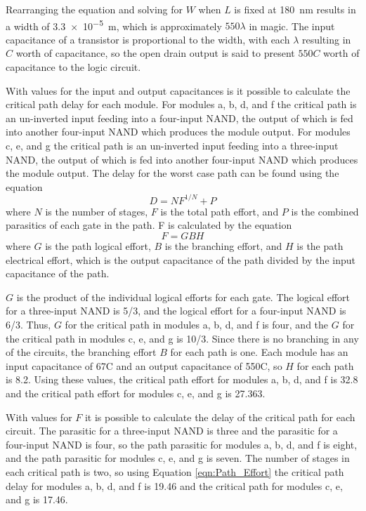 \documentclass[12pt]{article}
\begin{document}
Rearranging the equation and solving for \(W\) when \(L\) is fixed at \SI{180}{\nano\meter} results in a width of \SI{3.3e-5}{\meter}, which is approximately \(550 \lambda\) in magic.
The input capacitance of a transistor is proportional to the width, with each \(\lambda\) resulting in \(C\) worth of capacitance, so the open drain output is said to present \(550 C\) worth of capacitance to the logic circuit.

With values for the input and output capacitances is it possible to calculate the critical path delay for each module.
For modules a, b, d, and f the critical path is an un-inverted input feeding into a four-input NAND, the output of which is fed into another four-input NAND which produces the module output.
For modules c, e, and g the critical path is an un-inverted input feeding into a three-input NAND, the output of which is fed into another four-input NAND which produces the module output.
The delay for the worst case path can be found using the equation
\begin{equation}
	D = NF^{1/N}+P
\end{equation}
where \(N\) is the number of stages, \(F\) is the total path effort, and \(P\) is the combined parasitics of each gate in the path. F is calculated by the equation
\begin{equation}
	F = GBH
	\label{eqn:Path_Effort}
\end{equation}
where \(G\) is the path logical effort, \(B\) is the branching effort, and \(H\) is the path electrical effort, which is the output capacitance of the path divided by the input capacitance of the path.

\(G\) is the product of the individual logical efforts for each gate.
The logical effort for a three-input NAND is 5/3, and the logical effort for a four-input NAND is 6/3.
Thus, \(G\) for the critical path in modules a, b, d, and f is four, and the \(G\) for the critical path in modules c, e, and g is 10/3.
Since there is no branching in any of the circuits, the branching effort \(B\) for each path is one.
Each module has an input capacitance of 67C and an output capacitance of 550C, so \(H\) for each path is 8.2.
Using these values, the critical path effort for modules a, b, d, and f is 32.8 and the critical path effort for modules c, e, and g is 27.363.

With values for \(F\) it is possible to calculate the delay of the critical path for each circuit.
The parasitic for a three-input NAND is three and the parasitic for a four-input NAND is four, so the path parasitic for modules a, b, d, and f is eight, and the path parasitic for modules c, e, and g is seven. 
The number of stages in each critical path is two, so using Equation \ref{eqn:Path_Effort} the critical path delay for modules a, b, d, and f is 19.46 and the critical path for modules c, e, and g is 17.46.
\end{document}
